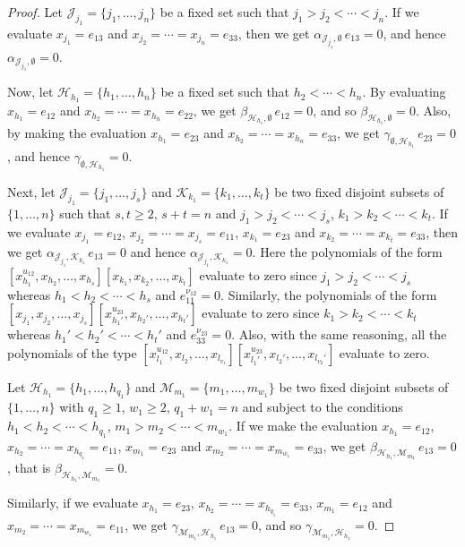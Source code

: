 \documentclass[a4paper,reqno]{amsart}
\theoremstyle{definition}
\numberwithin{equation}{section}
\numberwithin{theorem}{section}
\begin{document}
\begin{proof}
Let $\mathcal J_{j_1}=\{j_1,\ldots,j_n\}$ be a fixed set such that $j_1>j_2<\cdots<j_n$. If we
evaluate $x_{j_1}=e_{13}$ and $x_{j_2}=\cdots=x_{j_n}=e_{33}$, then we get
$\alpha_{\mathcal J_{j_1},\emptyset}\,e_{13}=0$, and hence $\alpha_{\mathcal J_{j_1},\emptyset}=0$.

Now, let $\mathcal H_{h_1}=\{h_1,\ldots,h_n\}$ be a fixed set such that $h_2<\cdots<h_n$. By
evaluating $x_{h_1}=e_{12}$ and $x_{h_2}=\cdots=x_{h_n}=e_{22}$, we get
$\beta_{\mathcal H_{h_1},\emptyset}\,e_{12}=0$, and so $\beta_{\mathcal H_{h_1},\emptyset}=0$.
Also, by making the evaluation $x_{h_1}=e_{23}$ and $x_{h_2}=\cdots=x_{h_n}=e_{33}$, we get
$\gamma_{\emptyset,\mathcal H_{h_1}}\,e_{23}=0$, and hence $\gamma_{\emptyset,\mathcal H_{h_1}}=0$.

Next, let $\mathcal J_{j_1}=\{j_1,\ldots,j_s\}$ and $\mathcal K_{k_1}=\{k_1,\ldots,k_t\}$ be two
fixed disjoint subsets of $\{1,\ldots,n\}$ such that $s,t\ge2$, $s+t=n$ and
$j_1>j_2<\cdots<j_s$, $k_1>k_2<\cdots<k_t$. If we evaluate $x_{j_1}=e_{12}$,
$x_{j_2}=\cdots=x_{j_s}=e_{11}$, $x_{k_1}=e_{23}$ and $x_{k_2}=\cdots=x_{k_t}=e_{33}$, then we get
$\alpha_{\mathcal J_{j_1},\mathcal K_{k_1}}\,e_{13}=0$ and hence $\alpha_{\mathcal J_{j_1},
\mathcal K_{k_1}}=0$. Here the polynomials of the form
$[x_{h_1}^{u_{12}},x_{h_2},\ldots,x_{h_s}][x_{k_1},x_{k_2},\ldots,x_{k_t}]$ evaluate to zero since
$j_1>j_2<\cdots<j_s$ whereas $h_1<h_2<\cdots<h_s$ and $e_{11}^{\nu_{12}}=0$. Similarly, the
polynomials of the form
$[x_{j_1},x_{j_2},\ldots,x_{j_s}][x_{h_1'}^{u_{23}},x_{h_2'},\ldots,x_{h_t'}]$ evaluate to zero
since $k_1>k_2<\cdots<k_t$ whereas $h_1'<h_2'<\cdots<h_t'$ and $e_{33}^{\nu_{23}}=0$. Also, with
the same reasoning, all the polynomials of the type
$[x_{l_1}^{u_{12}},x_{l_2},\ldots,x_{l_{v_1}}][x_{l_1'}^{u_{23}},x_{l_2'},\ldots,x_{l_{v_2}'}]$
evaluate to zero.

Let $\mathcal H_{h_1}=\{h_1,\ldots,h_{q_1}\}$ and $\mathcal M_{m_1}=\{m_1,\ldots,m_{w_1}\}$ be two
fixed disjoint subsets of $\{1,\ldots,n\}$ with $q_1\ge1$, $w_1\ge2$, $q_1+w_1=n$ and subject to
the conditions $h_1<h_2<\cdots<h_{q_1}$, $m_1>m_2<\cdots<m_{w_1}$. If we make the evaluation
$x_{h_1}=e_{12}$, $x_{h_2}=\cdots=x_{h_{q_1}}=e_{11}$, $x_{m_1}=e_{23}$ and
$x_{m_2}=\cdots=x_{m_{w_1}}=e_{33}$, we get $\beta_{\mathcal H_{h_1},\mathcal M_{m_1}}\,e_{13}=0$,
that is $\beta_{\mathcal H_{h_1},\mathcal M_{m_1}}=0$.

Similarly, if we evaluate $x_{h_1}=e_{23}$, $x_{h_2}=\cdots=x_{h_{q_1}}=e_{33}$, $x_{m_1}=e_{12}$
and $x_{m_2}=\cdots=x_{m_{w_1}}=e_{11}$, we get $\gamma_{\mathcal M_{m_1},\mathcal
H_{h_1}}\,e_{13}=0$, and so $\gamma_{\mathcal M_{m_1},\mathcal H_{h_1}}=0$.


\end{proof}
\end{document}
